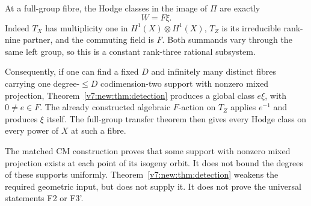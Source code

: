 At a full-group fibre, the Hodge classes in the image of \(\Pi\)
are exactly
\[
 W=F\xi.
\]
Indeed \(T_X\) has multiplicity one in \(H^1(X)\otimes H^1(X)\),
\(T_Z\) is its irreducible rank-nine partner, and the commuting
field is \(F\). Both summands vary through the same left group,
so this is a constant rank-three rational subsystem.

Consequently, if one can find a fixed \(D\) and infinitely many
distinct fibres carrying one degree-\(\le D\) codimension-two
support with nonzero mixed projection, Theorem~\ref{v7:new:thm:detection}
produces a global class \(e\xi\), with \(0\ne e\in F\).
The already constructed algebraic \(F\)-action on \(T_Z\) applies
\(e^{-1}\) and produces \(\xi\) itself. The full-group transfer
theorem then gives every Hodge class on every power of \(X\) at
such a fibre.

The matched CM construction proves that some support with nonzero
mixed projection exists at each point of its isogeny orbit.
It does not bound the degrees of these supports uniformly.
Theorem~\ref{v7:new:thm:detection} weakens the required geometric input,
but does not supply it. It does not prove the universal statements
F2 or F3'.
